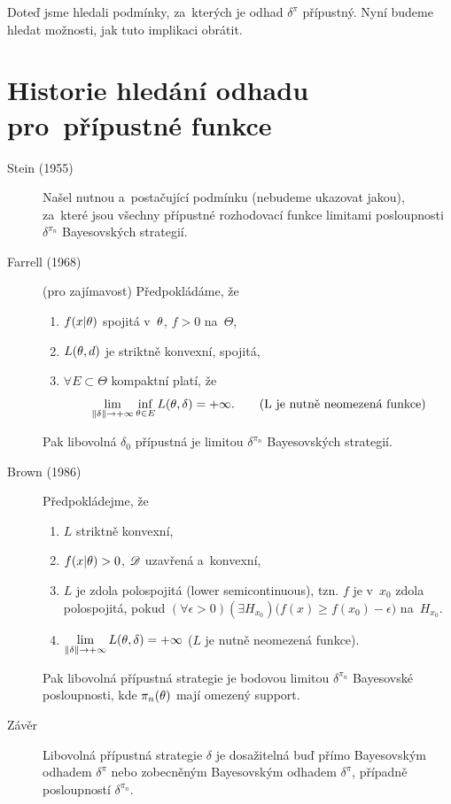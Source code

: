 \begin{remark}
	Doteď jsme hledali podmínky, za~kterých je odhad  $\delta^{\pi}$ přípustný. Nyní budeme hledat možnosti, jak tuto implikaci obrátit.
	\section{Historie hledání odhadu pro~přípustné funkce}
	\begin{description}
		\item[Stein (1955)] Našel nutnou a~postačující podmínku (nebudeme ukazovat jakou), za~které jsou všechny přípustné rozhodovací funkce limitami posloupnosti $\delta^{\pi_n}$ Bayesovských strategií.
		\item[Farrell (1968)] (pro zajímavost) Předpokládáme, že \begin{enumerate}[1)]
			\item $f(x|\theta)$ spojitá v~$\theta$, $f>0$ na~$\Theta$,
			\item $L(\theta,d)$ je striktně konvexní, spojitá,
			\item $\forall E\subset\Theta$ kompaktní platí, že 
			$$ \lim\limits_{\left\|\delta\right\|\to+\infty}\inf\limits_{\theta\in E}L(\theta,\delta)=+\infty.\qquad(\text{L je nutně neomezená funkce})$$ 
		\end{enumerate}
		Pak libovolná $\delta_0$ přípustná je limitou $\delta^{\pi_n}$ Bayesovských strategií.
		\item[Brown (1986)] Předpokládejme, že \begin{enumerate}[1)]
			\item $L$ striktně konvexní,
			\item $f(x|\theta)>0$, $\mathscr{D} $ uzavřená a~konvexní,
			\item $L$ je zdola polospojitá (lower semicontinuous), tzn. $f$ je v~$x_0$ zdola polospojitá, pokud $(\forall\epsilon>0)(\exists H_{x_0})\big(f(x)\geq f(x_0)-\epsilon\big)$ na~$H_{x_0}$.
			\item $\lim\limits_{\left\|\delta\right\|\to+\infty} L(\theta,\delta)=+\infty$ \hspace{0.2cm} ($L$ je nutně neomezená funkce).
		\end{enumerate}
		Pak libovolná přípustná strategie je bodovou limitou $\delta^{\pi_n}$ Bayesovské posloupnosti, kde $\pi_n(\theta)$ mají omezený support.
		\item[Závěr] Libovolná přípustná strategie $\delta$ je dosažitelná buď přímo Bayesovským odhadem $\delta^\pi$ nebo zobecněným Bayesovským odhadem $\delta^\pi$, případně posloupností $\delta^{\pi_n}$.
	\end{description}
\end{remark}
